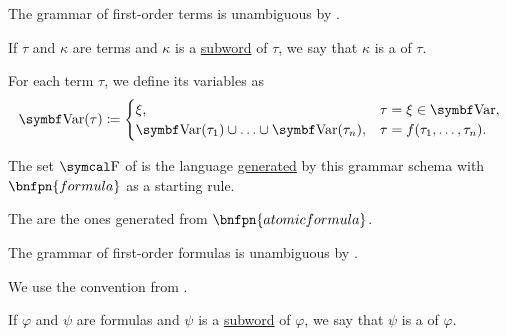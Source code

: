 \begin{definition}
\begin{DefEnum}
    The grammar of first-order terms is unambiguous by .

     If \( \tau \) and \( \kappa \) are terms and \( \kappa \) is a \hyperref[def:language/subword]{subword} of \( \tau \), we say that \( \kappa \) is a  of \( \tau \).

     For each term \( \tau \), we define its variables as
    \begin{equation*}
      \Bold{Var}(\tau) \coloneqq \begin{cases}
        \xi,                                                    &\tau = \xi \in \Bold{Var},        \\
        \Bold{Var}(\tau_1) \cup \ldots \cup \Bold{Var}(\tau_n), &\tau = f(\tau_1, \ldots, \tau_n).
      \end{cases}
    \end{equation*}

     The set \( \CF \) of  is the language \hyperref[def:grammar_derivation/grammar_language]{generated} by this grammar schema with \( \bnfpn{formula} \) as a starting rule.

    The  are the ones generated from \( \bnfpn{atomic formula} \).

    The grammar of first-order formulas is unambiguous by .

    We use the convention from .

     If \( \varphi \) and \( \psi \) are formulas and \( \psi \) is a \hyperref[def:language/subword]{subword} of \( \varphi \), we say that \( \psi \) is a  of \( \varphi \).


\end{DefEnum}
\end{definition}
